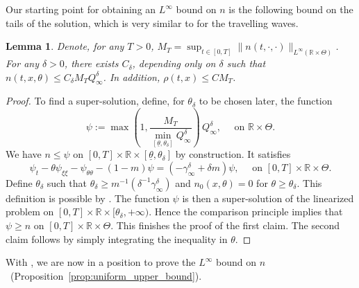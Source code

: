 \documentclass[11pt]{article}    %
\newtheorem{lemma}[theorem]{Lemma}
\newcommand{\R}{\mathbb{R}}
\begin{document}
Our starting point for obtaining an $L^\infty$ bound on $n$ is the following bound on the tails of the solution, which is very similar to  for the travelling waves.
\begin{lemma}\label{lem:tailsevol}
Denote, for any $T>0$, $M_T = \sup_{t\in[0,T]} \|n(t,\cdot,\cdot)\|_{L^\infty\left(\R\times\Theta\right)}$. For any $\delta > 0$, there exists $C_\delta$, depending only on $\delta$ such that $n(t,x,\theta) \leq C_\delta M_T Q_\infty^\delta$.  In addition, $\rho(t,x) \leq CM_T$.
\end{lemma}
\begin{proof}%

To find a super-solution, define, for $\theta_\delta$ to be chosen later, the function 
\begin{equation*}
	\psi  := \max \left( 1 , \frac{M_T}{\min_{[\underline\theta,\theta_\delta]} Q_\infty^\delta}\right) \, Q_\infty^\delta,
	\quad\text{ on }  \R\times \Theta.
\end{equation*}
We have $n \leq \psi$ on $[0,T] \times \R \times [\underline\theta,\theta_\delta]$ by construction. It satisfies
\begin{equation*}
\psi_t  - \theta \psi_{\xi\xi} - \psi_{\theta\theta} - \left( 1 - m \right)\psi  = \left( - \gamma_\infty^\delta + \delta m \right) \psi, \quad \text{ on } [0,T] \times \R \times \Theta.
\end{equation*}
Define $\theta_\delta$ such that $\theta_\delta \geq m^{-1}\left(\delta^{-1}  \gamma_\infty^\delta \right)$ and $n_0(x,\theta) = 0$ for $\theta \geq \theta_\delta$. This definition is possible by . The function $\psi$ is then a super-solution of the linearized problem on $[0,T] \times \R \times [\theta_\delta,+\infty)$. Hence the comparison principle implies that $\psi \geq n$ on $[0,T] \times \R \times \Theta$. This finishes the proof of the first claim.  The second claim follows by simply integrating the inequality in $\theta$.
\end{proof}

With , we are now in a position to prove the $L^\infty$ bound on $n$~(Proposition~\ref{prop:uniform_upper_bound}).

\end{document}
